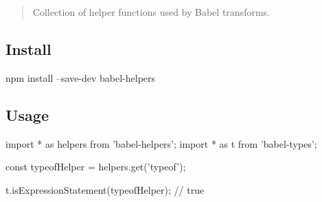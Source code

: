 \begin{quote}
Collection of helper functions used by Babel transforms. \end{quote}


\subsection*{Install}


\begin{DoxyCode}
npm install --save-dev babel-helpers
\end{DoxyCode}


\subsection*{Usage}


\begin{DoxyCode}
import * as helpers from 'babel-helpers';
import * as t from 'babel-types';

const typeofHelper = helpers.get('typeof');

t.isExpressionStatement(typeofHelper);
// true
\end{DoxyCode}
 